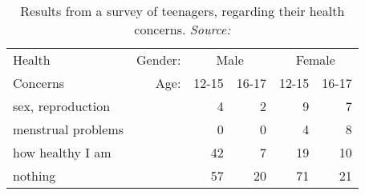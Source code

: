%
\begin{table}[htb]
\centering
\caption{Results from a survey of teenagers, regarding their health concerns.  \emph{Source:}
  \citet[Table 8-3]{Fienberg:80} }
\label{tab:health}
\begin{tabular}{l|rrrrr}
  \hline
 Health     &  Gender:  &  \multicolumn{2}{c}{Male}  & \multicolumn{2}{c}{Female}  \\
 Concerns   &  Age:     &  12-15  &  16-17  &  12-15  &  16-17  \\
  \hline
  sex, reproduction  &          &       4 &       2 &       9 &       7 \\
  menstrual problems &          &       0 &       0 &       4 &       8 \\
  how healthy I am   &          &      42 &       7 &      19 &      10 \\
  nothing            &          &      57 &      20 &      71 &      21 \\
   \hline
\end{tabular}
\end{table}
%
